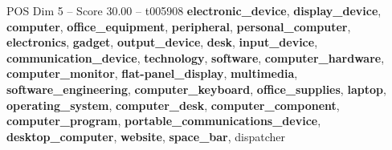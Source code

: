 \begin{textsample}{POS Dim 5 – Score 30.00 – t005908}  \label{ex:f5_pos_020}
\textbf{electronic\_device}, \textbf{display\_device}, \textbf{computer}, \textbf{office\_equipment}, \textbf{peripheral}, \textbf{personal\_computer}, \textbf{electronics}, \textbf{gadget}, \textbf{output\_device}, \textbf{desk}, \textbf{input\_device}, \textbf{communication\_device}, \textbf{technology}, \textbf{software}, \textbf{computer\_hardware}, \textbf{computer\_monitor}, \textbf{flat-panel\_display}, \textbf{multimedia}, \textbf{software\_engineering}, \textbf{computer\_keyboard}, \textbf{office\_supplies}, \textbf{laptop}, \textbf{operating\_system}, \textbf{computer\_desk}, \textbf{computer\_component}, \textbf{computer\_program}, \textbf{portable\_communications\_device}, \textbf{desktop\_computer}, \textbf{website}, \textbf{space\_bar}, dispatcher

\end{textsample}
